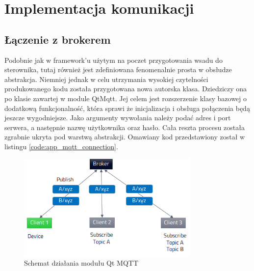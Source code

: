  \section{Implementacja komunikacji}
      \subsection{Łączenie z brokerem}
        Podobnie jak w framework'u użytym na poczet przygotowania wsadu do sterownika, tutaj również jest zdefiniowana fenomenalnie prosta w obsłudze abstrakcja. Niemniej jednak w celu utrzymania wysokiej czytelności produkowanego kodu została przygotowana nowa autorska klasa. Dziedziczy ona po klasie zawartej w module QtMqtt. Jej celem jest rozszerzenie klasy bazowej o dodatkową funkcjonalność, która sprawi że inicjalizacja i obsługa połączenia będą jeszcze wygodniejsze. Jako argumenty wywołania należy podać adres i port serwera, a następnie nazwę użytkownika oraz hasło. Cała reszta procesu została zgrabnie ukryta pod warstwą abstrakcji. Omawiany kod przedstawiony został w listingu \ref{code:app_mqtt_connection}.
        
                
       \begin{figure}[ht]
          \centering
          \includegraphics[width=0.8\textwidth]{img/qt_mqtt.png}
          \caption{Schemat działania modułu Qt MQTT}
          \label{fig:qt_mqtt}
        \end{figure}   
        
        \begin{kod}
          \inputminted[firstline=21, lastline=34]{cpp}{app/listings/mqtt.cpp}
          \caption{Nawiązanie połączenia z brokerem}
          \label{code:app_mqtt_connection}
        \end{kod}
        
